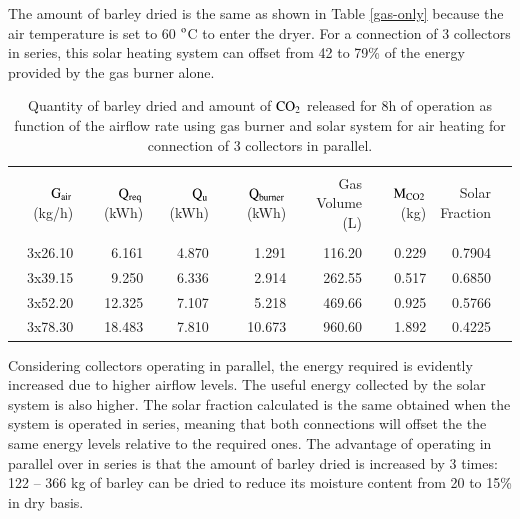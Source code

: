 The amount of barley dried is the same as shown in Table \ref{gas-only} because the air temperature is set to 60 $^{\rm{o}}$C to enter the dryer. For a connection of 3 collectors in series, this solar heating system can offset from 42 to 79\% of the energy provided by the gas burner alone. 

\begin{table}[h]
	\caption{Quantity of barley dried and amount of $\rm{CO_2}$ released for 8h of operation as function of the airflow rate using gas burner and solar system for air heating for connection of 3 collectors in parallel.}
	\centering
	
	\begin{tabular}{rrrrrrrr}
		\hline \\ [-10pt]
		\makecell{$\rm{G_{air}}$ \\ (kg/h)} & \makecell{$\rm{Q_{req}}$ \\ (kWh)} & 	\makecell{$\rm{Q_{u}}$ \\ (kWh)} & 	\makecell{$\rm{Q_{burner}}$  \\ (kWh)} & \makecell{Gas Volume \\ (L)} & \makecell{$\rm{M_{CO2}}$  \\ (kg)} & \makecell{Solar \\ Fraction} \\
		\hline \\ [-10pt]
		3x26.10 & 6.161 & 4.870 & 1.291 & 116.20 & 0.229 & 0.7904 \\ [2pt]
		3x39.15 & 9.250 & 6.336 & 2.914 & 262.55 & 0.517 & 0.6850 \\ [2pt]
		3x52.20 & 12.325 & 7.107 & 5.218 & 469.66 & 0.925 & 0.5766 \\ [2pt]
		3x78.30 & 18.483 & 7.810 & 10.673 & 960.60 & 1.892 & 0.4225 \\ 
		\hline
	\end{tabular}
	
	\label{gas-solar-parallel}
\end{table}

Considering collectors operating in parallel, the energy required is evidently increased due to higher airflow levels. The useful energy collected by the solar system is also higher. The solar fraction calculated is the same obtained when the system is operated in series, meaning that both connections will offset the the same energy levels relative to the required ones. The advantage of operating in parallel over in series is that the amount of barley dried is increased by 3 times: 122 -- 366 kg of barley can be dried to reduce its moisture content from 20 to 15\% in dry basis.




